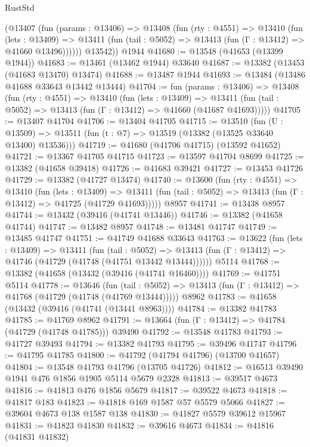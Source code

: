 \begin{lexlean}{RustStd}
\begin{coremodule}
        (@13407
          (fun (params : @13406) =>
          @13408
            (fun (rty : @4551) =>
            @13410
              (fun (lets : @13409) =>
              @13411 (fun (tail : @5052) => @13413 (fun (Γ : @13412) => @41660 @13496))))))
        @13542))
    @1944
@41680 := @13548 (@41653 (@13399 @1944))
@41683 := @13461 (@13462 @1944) @33640
@41687 := @13382 (@13453 (@41683 @13470) @13474)
@41688 := @13487 @1944
@41693 := @13484 (@13486 @41688 @33643 @13442 @13444)
@41704 := fun (params : @13406) =>
  @13408
    (fun (rty : @4551) =>
    @13410
      (fun (lets : @13409) =>
      @13411 (fun (tail : @5052) => @13413 (fun (Γ : @13412) => @41660 (@41687 @41693)))))
@41705 := @13407 @41704
@41706 := @13404 @41705
@41715 := @13510
    (fun (U : @13509) => @13511 (fun (t : @7) => @13519 (@13382 (@13525 @33640 @13400) @13536)))
@41719 := @41680 (@41706 @41715) (@13592 @41652)
@41721 := @13367 @41705 @41715
@41723 := @13597 @41704 @8699
@41725 := @13382 (@41658 @39418)
@41726 := @41683 @39421
@41727 := @13453 @41726
@41729 := @13382 (@41727 @13474)
@41740 := @13600
    (fun (rty : @4551) =>
    @13410
      (fun (lets : @13409) =>
      @13411 (fun (tail : @5052) => @13413 (fun (Γ : @13412) => @41725 (@41729 @41693)))))
    @8957
@41741 := @13438 @8957
@41744 := @13432 (@39416 (@41741 @13446))
@41746 := @13382 (@41658 @41744)
@41747 := @13482 @8957
@41748 := @13481 @41747
@41749 := @13485 @41747
@41751 := @41749 @41688 @33643
@41763 := @13622
    (fun (lets : @13409) =>
    @13411
      (fun (tail : @5052) =>
      @13413 (fun (Γ : @13412) => @41746 (@41729 (@41748 (@41751 @13442 @13444))))))
    @5114
@41768 := @13382 (@41658 (@13432 (@39416 (@41741 @16460))))
@41769 := @41751 @5114
@41778 := @13646
    (fun (tail : @5052) => @13413 (fun (Γ : @13412) => @41768 (@41729 (@41748 (@41769 @13444)))))
    @8962
@41783 := @41658 (@13432 (@39416 (@41741 (@13441 @8963))))
@41784 := @13382 @41783
@41785 := @41769 @8962
@41791 := @13664 (fun (Γ : @13412) => @41784 (@41729 (@41748 @41785))) @39490
@41792 := @13548 @41783
@41793 := @41727 @39493
@41794 := @13382 @41793
@41795 := @39496 @41747
@41796 := @41795 @41785
@41800 := @41792 (@41794 @41796) (@13700 @41657)
@41804 := @13548 @41793 @41796 (@13705 @41726)
@41812 := @16513 @39490 @1941 @476 @1856 @1905 @5114 @5679 @2328
@41813 := @39517 @4673
@41816 := @41813 @476 @1856 @5679
@41817 := @39522 @4673
@41818 := @41817 @183
@41823 := @41818 @169 @1587 @57 @5579 @5066
@41827 := @39604 @4673 @138 @1587 @138
@41830 := @41827 @5579 @39612 @15967
@41831 := @41823 @41830
@41832 := @39616 @4673
@41834 := @41816 (@41831 @41832)

\end{coremodule}
\end{lexlean}
